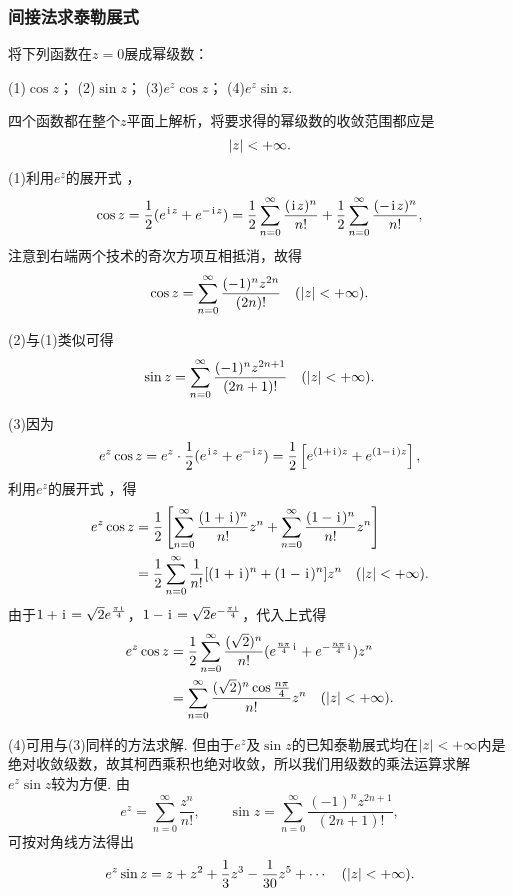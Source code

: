 \subsubsection{间接法求泰勒展式}
\begin{example}
将下列函数在\(z = 0\)展成幂级数：

(1)\(\cos z\)； \hfill (2)\(\sin z\)； \hfill (3)\(e^z \cos z\)； \hfill (4)\(e^z \sin z\).
\begin{solution}
四个函数都在整个\(z\)平面上解析，将要求得的幂级数的收敛范围都应是\[
\abs{z}<+\infty.
\]

(1)利用\(e^z\)的展开式 ，\[
\cos z = \frac{1}{2} (e^{\kern1pt\mathrm{i}\kern1pt z} + e^{-\kern1pt\mathrm{i}\kern1pt z})
= \frac{1}{2} \sum\limits_{n=0}^\infty \frac{(\kern1pt\mathrm{i}\kern1pt z)^n}{n!} + \frac{1}{2} \sum\limits_{n=0}^\infty \frac{(-\kern1pt\mathrm{i}\kern1pt z)^n}{n!},
\]注意到右端两个技术的奇次方项互相抵消，故得\begin{equation}\label{equation:解析函数的级数表示.余弦函数的泰勒展式}
\cos z = \sum\limits_{n=0}^\infty \frac{(-1)^n z^{2n}}{(2n)!} \quad(\abs{z}<+\infty).
\end{equation}

(2)与(1)类似可得\begin{equation}\label{equation:解析函数的级数表示.正弦函数的泰勒展式}
\sin z = \sum\limits_{n=0}^\infty \frac{(-1)^n z^{2n+1}}{(2n+1)!} \quad(\abs{z}<+\infty).
\end{equation}

(3)因为\[
e^z \cos z = e^z \cdot \frac{1}{2} (e^{\kern1pt\mathrm{i}\kern1pt z} + e^{-\kern1pt\mathrm{i}\kern1pt z})
= \frac{1}{2} \left[e^{(1+\kern1pt\mathrm{i}\kern1pt)z} + e^{(1-\kern1pt\mathrm{i}\kern1pt)z}\right],
\]利用\(e^z\)的展开式 ，得\begin{align*}
e^z \cos z
&= \frac{1}{2} \left[
\sum\limits_{n=0}^\infty \frac{(1+\kern1pt\mathrm{i}\kern1pt)^n}{n!} z^n
+ \sum\limits_{n=0}^\infty \frac{(1-\kern1pt\mathrm{i}\kern1pt)^n}{n!} z^n
\right] \\
&= \frac{1}{2} \sum\limits_{n=0}^\infty \frac{1}{n!} [(1+\kern1pt\mathrm{i}\kern1pt)^n+(1-\kern1pt\mathrm{i}\kern1pt)^n] z^n
\quad(\abs{z}<+\infty).
\end{align*}
由于\(1+\kern1pt\mathrm{i}\kern1pt=\sqrt{2} e^{\frac{\pi\kern1pt\mathrm{i}\kern1pt}{4}}\)，\(1-\kern1pt\mathrm{i}\kern1pt=\sqrt{2} e^{-\frac{\pi\kern1pt\mathrm{i}\kern1pt}{4}}\)，代入上式得\begin{equation}
\begin{split}
e^z \cos z
&= \frac{1}{2} \sum\limits_{n=0}^\infty \frac{(\sqrt{2})^n}{n!} (e^{\frac{n\pi}{4}\kern1pt\mathrm{i}\kern1pt}+e^{-\frac{n\pi}{4}\kern1pt\mathrm{i}\kern1pt}) z^n \\
&= \sum\limits_{n=0}^\infty \frac{(\sqrt{2})^n \cos\frac{n\pi}{4}}{n!} z^n
\quad(\abs{z}<+\infty).
\end{split}
\end{equation}

(4)可用与(3)同样的方法求解.
但由于\(e^z\)及\(\sin z\)的已知泰勒展式均在\(\abs{z}<+\infty\)内是绝对收敛级数，故其柯西乘积也绝对收敛，所以我们用级数的乘法运算求解\(e^z \sin z\)较为方便.
由\[
e^z = \sum\limits_{n=0}^\infty \frac{z^n}{n!},
\qquad
\sin z = \sum\limits_{n=0}^\infty \frac{(-1)^n z^{2n+1}}{(2n+1)!},
\]可按对角线方法得出\[
e^z \sin z
= z + z^2 + \frac{1}{3} z^3 - \frac{1}{30} z^5 + \dotsb
\quad(\abs{z}<+\infty).
\]
\end{solution}
\end{example}

